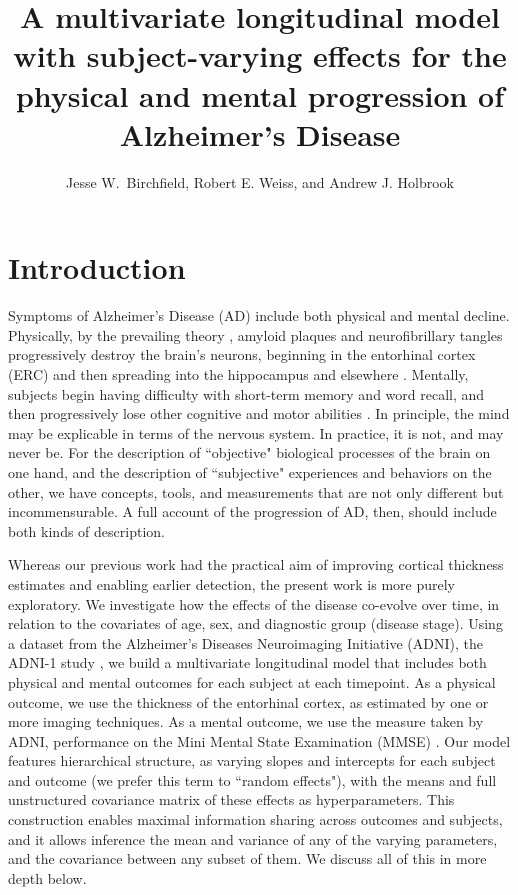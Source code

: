 \documentclass[12pt]{article}
\title{A multivariate longitudinal model with subject-varying effects for the physical and mental progression of Alzheimer's Disease}
\author{Jesse W.~Birchfield, Robert E. Weiss, and Andrew J. Holbrook}
\begin{document}
\maketitle

\pagebreak
\section{Introduction}

Symptoms of Alzheimer's Disease (AD) include both physical and mental decline. Physically, by the prevailing theory \citep{jack2010hypothetical}, amyloid plaques and neurofibrillary tangles progressively destroy the brain's neurons, beginning in the entorhinal cortex (ERC) and then spreading into the hippocampus and elsewhere \citep{holbrook2020anterolateral}. Mentally, subjects begin having difficulty with short-term memory and word recall, and then progressively lose other cognitive and motor abilities \citep{rodgers2002alzheimer}. In principle, the mind may be explicable in terms of the nervous system. In practice, it is not, and may never be. For the description of ``objective" biological processes of the brain on one hand, and the description of ``subjective" experiences and behaviors on the other, we have concepts, tools, and measurements that are not only different but incommensurable. A full account of the progression of AD, then, should include both kinds of description. 

Whereas our previous work had the practical aim of improving cortical thickness estimates and enabling earlier detection, the present work is more purely exploratory. We investigate how the effects of the disease co-evolve over time, in relation to the covariates of age, sex, and diagnostic group (disease stage). Using a dataset from the Alzheimer's Diseases Neuroimaging Initiative (ADNI), the ADNI-1 study \citep{mueller2005ways, jack2008alzheimer, petersen2010alzheimer}, we build a multivariate longitudinal model that includes both physical and mental outcomes for each subject at each timepoint. As a physical outcome, we use the thickness of the entorhinal cortex, as estimated by one or more imaging techniques. As a mental outcome, we use the measure taken by ADNI, performance on the Mini Mental State Examination (MMSE) \citep{tombaugh1992mini}. Our model features hierarchical structure, as varying slopes and intercepts for each subject and outcome (we prefer this term to ``random effects"), with the means and full unstructured covariance matrix of these effects as hyperparameters. This construction enables maximal information sharing across outcomes and subjects, and it allows inference the mean and variance of any of the varying parameters, and the covariance between any subset of them. We discuss all of this in more depth below.
\end{document}
